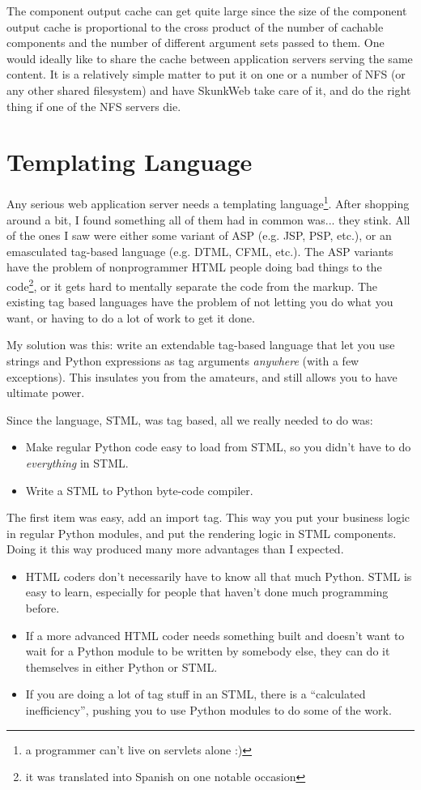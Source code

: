 \documentclass[twocolumn]{article}
\begin{document}
The component output cache can get quite large since the size of the
component output cache is proportional to the cross product of the
number of cachable components and the number of different argument
sets passed to them. One would ideally like to share the cache between
application servers serving the same content.  It is a relatively
simple matter to put it on one or a number of NFS (or any other shared
filesystem) and have SkunkWeb take care of it, and do the right thing
if one of the NFS servers die.
 
\section{Templating Language}
Any serious web application server needs a templating
language\footnote{a programmer can't live on servlets alone :)}.
After shopping around a bit, I found something all of them had in
common was... they stink.  All of the ones I saw were either some
variant of ASP\cite{asp} (e.g. JSP\cite{jsp}, PSP\cite{psp}, etc.), or
an emasculated tag-based language (e.g. DTML\cite{dtml},
CFML\cite{cfml}, etc.).  The ASP variants have the problem of
nonprogrammer HTML people doing bad things to the
code\footnote{it was translated into Spanish on one notable occasion},
or it gets hard to mentally separate the code from the markup.
The existing tag based languages have the problem of not 
letting you do what you want, or having to do a lot of work to get it
done.

My solution was this: write an extendable tag-based language that let
you use strings and Python expressions as tag arguments
\emph{anywhere} (with a few exceptions).  This insulates you from the
amateurs, and still allows you to have ultimate power.

Since the language, STML, was tag based, all we really needed to do
was:
\begin{itemize}
\item Make regular Python code easy to load from STML, so you didn't
have to do \emph{everything} in STML.
\item Write a STML to Python byte-code compiler.
\end{itemize}

The first item was easy, add an import tag.  This way you put your
business logic in regular Python modules, and put the rendering logic
in STML components.  Doing it this way produced many more advantages
than I expected.
\begin{itemize}
\item HTML coders don't necessarily have to know all that much Python.
STML is easy to learn, especially for people that haven't
done much programming before.
\item If a more advanced HTML coder needs something built and doesn't want
to wait for a Python module to be written by somebody else, they can
do it themselves in either Python or STML.
\item If you are doing a lot of tag stuff in an STML, there is a
``calculated inefficiency'', pushing you to use Python modules to do
some of the work.
\end{itemize}
\end{document}
